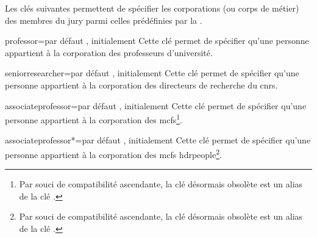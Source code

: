 Les clés suivantes\syntaxeoptions{} permettent de spécifier les corporations (ou
corps de métier) des membres du jury parmi celles prédéfinies par la \yatCl{}.

\begin{docKey}{professor}{=\textbar{}}{par défaut
    , initialement }
  Cette clé permet de spécifier qu'une personne appartient à la corporation des
  professeurs d'université.
\end{docKey}
%
\begin{docKey}{seniorresearcher}{=\textbar{}}{par
    défaut , initialement }
  Cette clé permet de spécifier qu'une personne appartient à la corporation des
  directeurs de recherche du \gls{cnrs}.
\end{docKey}
%
\begin{docKey}[][doc updated=2016-10-24]{associateprofessor}{=\textbar{}}{par défaut
    , initialement }
  Cette clé permet de spécifier qu'une personne appartient à la corporation des
  \glspl{mcf}\footnote{Par souci de compatibilité ascendante, la clé désormais
    obsolète  est un alias de la clé .}.
\end{docKey}
%
\begin{docKey}[][doc updated=2016-10-24]{associateprofessor*}{=\textbar{}}{par défaut
    , initialement }
  Cette clé permet de spécifier qu'une personne appartient à la corporation des
  \glspl{mcf} \acrshort{hdrpeople}\footnote{Par souci de compatibilité
    ascendante, la clé désormais obsolète  est un alias de la clé
    .}.
\end{docKey}
